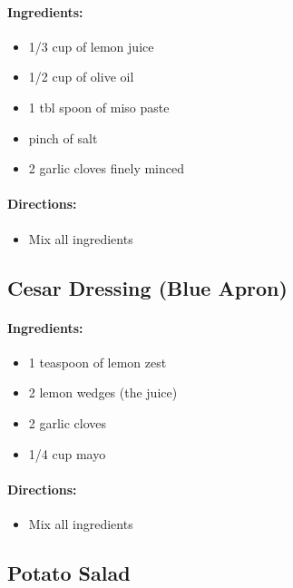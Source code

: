 \documentclass{article}
\begin{document}
\paragraph{Ingredients:}

\begin{itemize}
	\item 1/3 cup of lemon juice
	\item 1/2 cup of olive oil
	\item 1 tbl spoon of miso paste
	\item pinch of salt
	\item 2 garlic cloves finely minced
\end{itemize}

\paragraph{Directions:}
\begin{itemize}
	\item Mix all ingredients
\end{itemize}

\subsection{Cesar Dressing (Blue Apron)}

\paragraph{Ingredients:}

\begin{itemize}
	\item 1 teaspoon of lemon zest
	\item 2 lemon wedges (the juice)
	\item 2 garlic cloves
	\item 1/4 cup mayo
\end{itemize}

\paragraph{Directions:}
\begin{itemize}
	\item Mix all ingredients
\end{itemize}

\subsection{Potato Salad}
\end{document}
